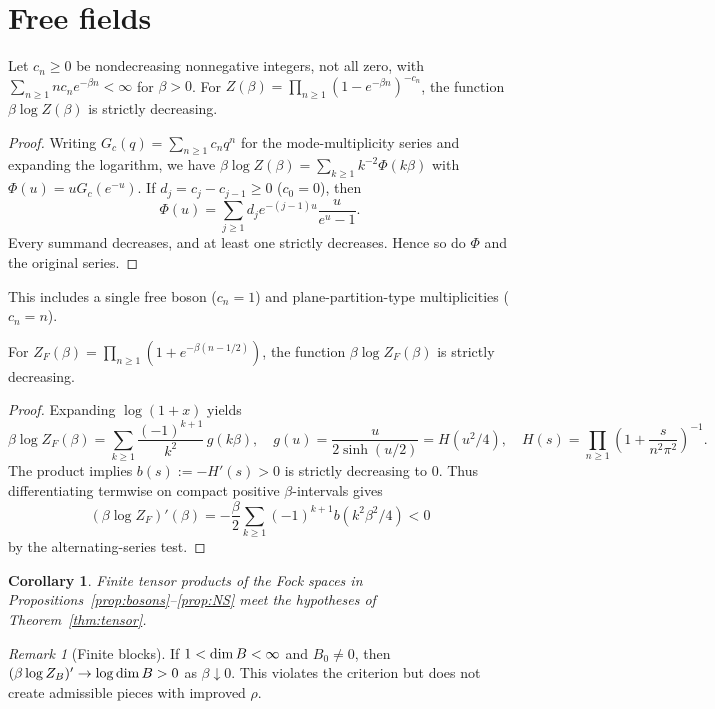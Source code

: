 \documentclass[10pt,a4paper]{article}
\numberwithin{equation}{section}
\newtheorem{corollary}[theorem]{Corollary}
\theoremstyle{remark}\newtheorem{remark}[theorem]{Remark}\newtheorem{question}[theorem]{Question}
\begin{document}
\section{Free fields}\label{sec:free}
\begin{proposition}\label{prop:bosons}
Let $c_n\ge0$ be nondecreasing nonnegative integers, not all zero, with $\sum_{n\ge1}nc_ne^{-\beta n}<\infty$ for $\beta>0$. For $Z(\beta)=\prod_{n\ge1}(1-e^{-\beta n})^{-c_n}$, the function $\beta\log Z(\beta)$ is strictly decreasing.
\end{proposition}
\begin{proof}Writing $G_c(q)=\sum_{n\ge1}c_nq^n$ for the mode-multiplicity series and expanding the logarithm, we have $\beta\log Z(\beta)=\sum_{k\ge1}k^{-2}\Phi(k\beta)$ with $\Phi(u)=uG_c(e^{-u})$. If $d_j=c_j-c_{j-1}\ge0$ ($c_0=0$), then
\[\Phi(u)=\sum_{j\ge1}d_je^{-(j-1)u}\frac{u}{e^u-1}.\]
Every summand decreases, and at least one strictly decreases. Hence so do $\Phi$ and the original series.\end{proof}
This includes a single free boson ($c_n=1$) and plane-partition-type multiplicities ($c_n=n$).
\begin{proposition}\label{prop:NS}
For $Z_F(\beta)=\prod_{n\ge1}(1+e^{-\beta(n-1/2)})$, the function $\beta\log Z_F(\beta)$ is strictly decreasing.
\end{proposition}
\begin{proof}Expanding $\log(1+x)$ yields
\[
\beta\log Z_F(\beta)=\sum_{k\ge1}\frac{(-1)^{k+1}}{k^2}\,g(k\beta),\quad
 g(u)=\frac{u}{2\sinh(u/2)}=H(u^2/4),\quad H(s)=\prod_{n\ge1}\left(1+\frac{s}{n^2\pi^2}\right)^{-1}.
\]
The product implies $b(s):=-H'(s)>0$ is strictly decreasing to $0$. Thus differentiating termwise on compact positive $\beta$-intervals gives
\[
(\beta\log Z_F)'(\beta)=-\frac\beta2\sum_{k\ge1}(-1)^{k+1}b(k^2\beta^2/4)<0
\]
by the alternating-series test.\end{proof}
\begin{corollary}Finite tensor products of the Fock spaces in Propositions~\ref{prop:bosons}--\ref{prop:NS} meet the hypotheses of Theorem~\ref{thm:tensor}.\end{corollary}
\begin{remark}[Finite blocks]If $1<\operatorname{dim} B<\infty$ and $B_0\ne0$, then $(\beta\log Z_B)'\to\log\operatorname{dim} B>0$ as $\beta\downarrow0$. This violates the criterion but does not create admissible pieces with improved $\rho$.\end{remark}
\end{document}
